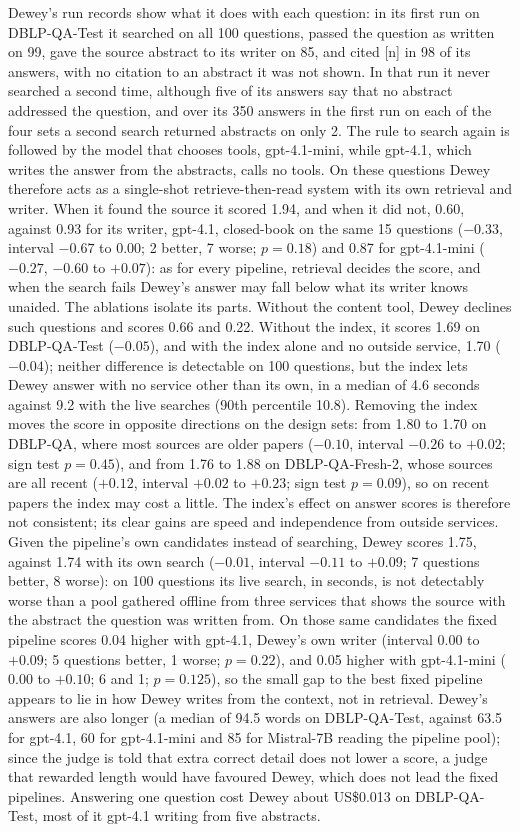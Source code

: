 \documentclass[conference]{IEEEtran}
\newcommand{\dq}{DBLP-QA}
\newcommand{\freshb}{DBLP-QA-Fresh-2}
\newcommand{\test}{DBLP-QA-Test}
\begin{document}
Dewey's run records show what it does with each question: in its first run on \test{} it searched on all 100 questions, passed
the question as written on 99, gave the source abstract to its writer on 85, and cited [n] in 98 of its
answers, with no citation to an abstract it was not shown. In that run it never searched a second time,
although five of its answers say that no abstract addressed the question, and over its 350 answers in the first run on each of the
four sets a second search returned abstracts on only 2. The rule to search again is followed by the model
that chooses tools, gpt-4.1-mini, while gpt-4.1, which writes the answer from the abstracts, calls no
tools. On these questions Dewey therefore acts as a single-shot retrieve-then-read system with its own
retrieval and writer. When it found the source it scored 1.94, and
when it did not, 0.60, against 0.93 for its writer, gpt-4.1, closed-book on the same 15 questions
($-0.33$, interval $-0.67$ to $0.00$; 2 better, 7 worse; $p=0.18$) and 0.87 for gpt-4.1-mini ($-0.27$,
$-0.60$ to $+0.07$): as for every pipeline, retrieval decides the score, and when the search fails
Dewey's answer may fall below what its writer knows unaided. The ablations isolate its parts. Without the content tool,
Dewey declines such questions and scores 0.66 and 0.22. Without the index, it scores 1.69 on \test{}
($-0.05$), and with the index alone and no outside service, 1.70 ($-0.04$); neither difference is
detectable on 100 questions, but the index lets Dewey answer with no service other than its own, in a
median of 4.6 seconds against 9.2 with the live searches (90th percentile 10.8). Removing the index moves
the score in opposite directions on the design sets: from 1.80 to 1.70 on \dq{}, where most sources are
older papers ($-0.10$, interval $-0.26$ to $+0.02$; sign test $p=0.45$), and from 1.76 to 1.88 on
\freshb{}, whose sources are all recent ($+0.12$, interval $+0.02$ to $+0.23$; sign test $p=0.09$), so on
recent papers the index may cost a little. The index's effect on answer scores is therefore not
consistent; its clear gains are speed and independence from outside services. Given the pipeline's own
candidates instead of searching, Dewey scores 1.75, against 1.74 with its own search ($-0.01$, interval
$-0.11$ to $+0.09$; 7 questions better, 8 worse): on 100 questions its live search, in seconds, is not
detectably worse than a pool gathered offline from three services that shows the source with the
abstract the question was written from. On those same candidates the fixed pipeline scores 0.04 higher
with gpt-4.1, Dewey's own writer (interval $0.00$ to $+0.09$; 5 questions better, 1 worse; $p=0.22$), and
0.05 higher with gpt-4.1-mini ($0.00$ to $+0.10$; 6 and 1; $p=0.125$), so the small gap to the best fixed
pipeline appears to lie in how Dewey writes from the context, not in retrieval. Dewey's answers are also
longer (a median of 94.5 words on \test{}, against 63.5 for gpt-4.1, 60 for gpt-4.1-mini and 85 for
Mistral-7B reading the pipeline pool); since the judge is told that extra correct detail does not lower a
score, a judge that rewarded length would have favoured Dewey, which does not lead the fixed pipelines.
Answering one question cost Dewey about US\$0.013 on \test{}, most of it gpt-4.1 writing from five
abstracts.
\end{document}
